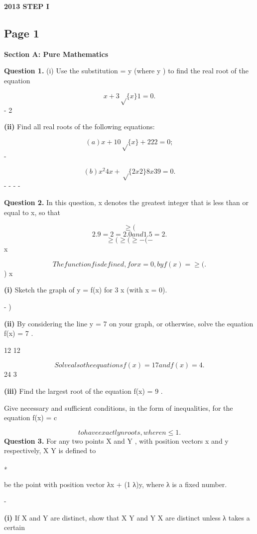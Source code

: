 \documentclass[12pt]{article}
\begin{document}
\begin{center}
{\Large \textbf{2013 STEP I}}
\end{center}

\subsection*{Page 1}
\begin{flushleft}
\bigskip\textbf{Section A: Pure Mathematics}\par
\bigskip\textbf{Question 1.} (i) Use the substitution \sqrtx = y (where y ) to find the real root of the equation\par
\[x + 3 \sqrt\{x\} 1 = 0 .\]
- 2\par
\textbf{(ii)} Find all real roots of the following equations:\par
\[(a) x + 10 \sqrt\{x\} + 2 22 = 0 ;\]
-\par
\[(b) x^2 4x + \sqrt\{2x2\} 8x 3 9 = 0 .\]
- - - -\par
\bigskip\textbf{Question 2.} In this question, x denotes the greatest integer that is less than or equal to x, so that\par
\[\geq (\]
\[2.9 = 2 = 2.0 and 1.5 = 2.\]
\[\geq ( \geq ( \geq- ( -\]
x\par
\[The function f is defined, for x = 0, by f(x) = \geq ( .\]
) x\par
\textbf{(i)} Sketch the graph of y = f(x) for 3 \geq x  (with x = 0).\par
- )\par
\textbf{(ii)} By considering the line y = 7 on your graph, or otherwise, solve the equation f(x) = 7 .\par
12 12\par
\[Solve also the equations f(x) = 17 and f(x) = 4 .\]
24 3\par
\textbf{(iii)} Find the largest root of the equation f(x) = 9 .\par
Give necessary and sufficient conditions, in the form of inequalities, for the equation f(x) = c\par
\[to have exactly n roots, where n \leq 1.\]
\bigskip\textbf{Question 3.} For any two points X and Y , with position vectors x and y respectively, X Y is defined to\par
∗\par
be the point with position vector λx + (1 λ)y, where λ is a fixed number.\par
-\par
\textbf{(i)} If X and Y are distinct, show that X Y and Y X are distinct unless λ takes a certain\par

\end{flushleft}
\end{document}
